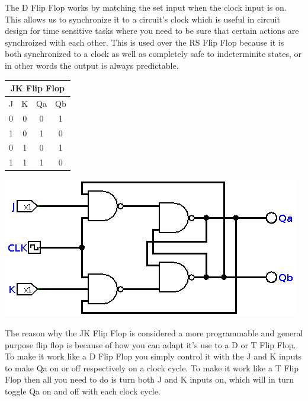 \documentclass[11pt]{scrartcl}
\begin{document}
The D Flip Flop works by matching the set input when the clock input is on. This allows us to synchronize it to a circuit's clock which is
useful in circuit design for time sensitive tasks where you need to be sure that certain actions are synchroized with each other. This is
used over the RS Flip Flop because it is both synchronized to a clock as well as completely safe to indeterminite states, or in other
words the output is always predictable.

\begin{center}
    \begin{tabular}{c c|c c}
        \multicolumn{4}{c}{JK Flip Flop} \\
        \hline
        J & K & Qa & Qb \\
        0 & 0 & 0 & 1 \\
        1 & 0 & 1 & 0 \\
        0 & 1 & 0 & 1 \\
        1 & 1 & 1 & 0 \\
    \end{tabular}

    \includegraphics[scale=0.6]{images/jkflipflop.png}
\end{center}

The reason why the JK Flip Flop is considered a more programmable and general purpose flip flop is because of how you can adapt it's use to
a D or T Flip Flop. To make it work like a D Flip Flop you simply control it with the J and K inputs to make Qa on or off respectively
on a clock cycle. To make it work like a T Flip Flop then all you need to do is turn both J and K inputs on, which will in turn toggle Qa
on and off with each clock cycle.
\end{document}
